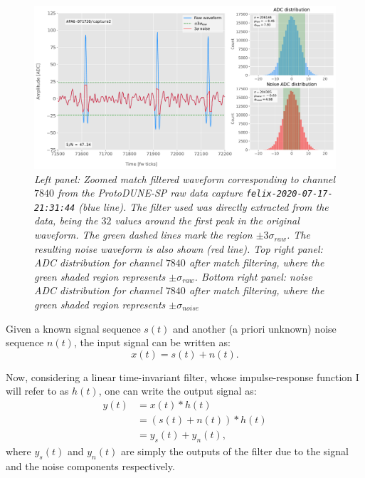 \begin{figure}[t]
	\centering
	\includegraphics[width=1\linewidth]{Images/Matched_Filter/waveform_example_mf}
	\caption{\textit{Left panel: Zoomed match filtered waveform corresponding to channel $7840$ from the ProtoDUNE-SP raw data capture \texttt{felix-2020-07-17-21:31:44} (blue line). The filter used was directly extracted from the data, being the $32$ values around the first peak in the original waveform. The green dashed lines mark the region $\pm3\sigma_{raw}$. The resulting noise waveform is also shown (red line). Top right panel: ADC distribution for channel $7840$ after match filtering, where the green shaded region represents $\pm \sigma_{raw}$. Bottom right panel: noise ADC distribution for channel $7840$ after match filtering, where the green shaded region represents $\pm \sigma_{noise}$}}
	\label{fig:adcs_mf}
\end{figure}

Given a known signal sequence $s(t)$ and another (a priori unknown) noise sequence $n(t)$, the input signal can be written as:
\begin{equation}\label{2.4.1}
	x(t) = s(t) + n(t).
\end{equation}

Now, considering a linear time-invariant filter, whose impulse-response function I will refer to as $h(t)$, one can write the output signal as:
\begin{equation}\label{2.4.2}
	\begin{split}
		y(t) &= x(t)*h(t)\\
		&= \left(s(t) + n(t)\right)*h(t)\\
		&= y_{s}(t) + y_{n}(t),
	\end{split}
\end{equation}
where $y_{s}(t)$ and $y_{n}(t)$ are simply the outputs of the filter due to the signal and the noise components respectively.

